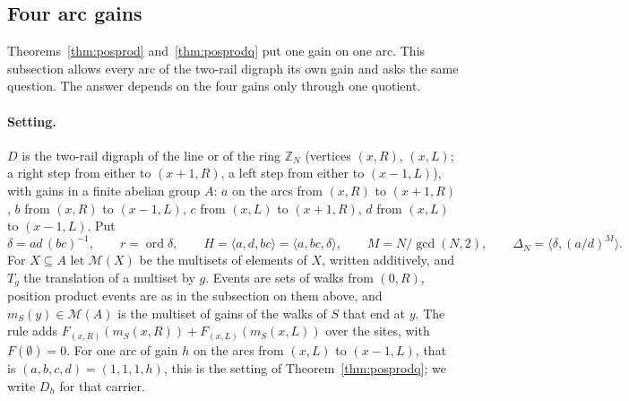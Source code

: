 
\subsection{Four arc gains}

Theorems~\ref{thm:posprod} and~\ref{thm:posprodq} put one gain on one arc. This subsection allows every arc of the two-rail digraph its own gain and asks the same question. The answer depends on the four gains only through one quotient.

\paragraph{Setting.} $D$ is the two-rail digraph of the line or of the ring $\mathbb{Z}_N$ (vertices $(x,R)$, $(x,L)$; a right step from either to $(x+1,R)$, a left step from either to $(x-1,L)$), with gains in a finite abelian group $A$: $a$ on the arcs from $(x,R)$ to $(x+1,R)$, $b$ from $(x,R)$ to $(x-1,L)$, $c$ from $(x,L)$ to $(x+1,R)$, $d$ from $(x,L)$ to $(x-1,L)$. Put
\[
\delta=ad\,(bc)^{-1},\qquad r=\operatorname{ord}\delta,\qquad H=\langle a,d,bc\rangle=\langle a,bc,\delta\rangle,\qquad M=N/\gcd(N,2),\qquad \Delta_N=\langle\delta,(a/d)^{M}\rangle .
\]
For $X\subseteq A$ let $\mathcal{M}(X)$ be the multisets of elements of $X$, written additively, and $T_g$ the translation of a multiset by $g$. Events are sets of walks from $(0,R)$, position product events are as in the subsection on them above, and $m_S(y)\in\mathcal{M}(A)$ is the multiset of gains of the walks of $S$ that end at $y$. The rule adds $F_{(x,R)}(m_S(x,R))+F_{(x,L)}(m_S(x,L))$ over the sites, with $F(\emptyset)=0$. For one arc of gain $h$ on the arcs from $(x,L)$ to $(x-1,L)$, that is $(a,b,c,d)=(1,1,1,h)$, this is the setting of Theorem~\ref{thm:posprodq}; we write $D_h$ for that carrier.

